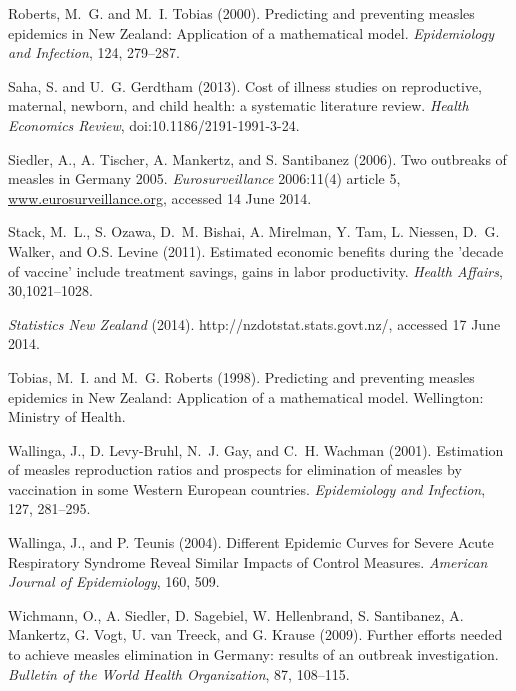 \documentclass{article}
\begin{document}
\begin{thebibliography}{}
Roberts, M.~G. and M.~I. Tobias (2000).
\newblock Predicting and preventing measles epidemics in New Zealand: Application of a mathematical model. 
\newblock \emph{Epidemiology and Infection}, 124, 279--287.

Saha, S. and U.~G. Gerdtham (2013).
\newblock Cost of illness studies on reproductive, maternal, newborn, and child health: a systematic literature review.
\newblock \emph{Health Economics Review}, doi:10.1186/2191-1991-3-24.

Siedler, A., A. Tischer, A. Mankertz, and S. Santibanez (2006).
\newblock Two outbreaks of measles in Germany 2005.
\newblock \emph{Eurosurveillance} 2006:11(4) article 5, \href{http://www.eurosurveillance.org/ViewArticle.aspx?ArticleId=615}{www.eurosurveillance.org}, accessed 14 June 2014.

Stack, M.~L., S. Ozawa, D.~M. Bishai, A. Mirelman, Y. Tam, L. Niessen, D.~G. Walker, and O.S. Levine (2011).
\newblock Estimated economic benefits during the 'decade of vaccine' include treatment savings, gains in labor productivity.
\newblock \emph{Health Affairs}, 30,1021--1028.

\newblock \emph{Statistics New Zealand} (2014).
http://nzdotstat.stats.govt.nz/, accessed 17 June 2014.

Tobias, M.~I. and M.~G. Roberts (1998).
\newblock Predicting and preventing measles epidemics in New Zealand: Application of a mathematical model.
\newblock Wellington: Ministry of Health.

Wallinga, J., D. Levy-Bruhl, N.~J. Gay, and C.~H. Wachman (2001).
\newblock Estimation of measles reproduction ratios and prospects for elimination of measles by vaccination in some Western European countries.
\newblock \emph{Epidemiology and Infection}, 127, 281--295.

Wallinga, J., and P. Teunis (2004).
\newblock Different Epidemic Curves for Severe Acute Respiratory Syndrome Reveal Similar Impacts of Control Measures.
\newblock \emph{American Journal of Epidemiology}, 160, 509.

Wichmann, O., A. Siedler, D. Sagebiel, W. Hellenbrand, S. Santibanez, A. Mankertz, G. Vogt, U. van Treeck, and G. Krause (2009).
\newblock Further efforts needed to achieve measles elimination in Germany: results of an outbreak investigation.
\newblock \emph{Bulletin of the World Health Organization}, 87, 108--115.


\end{thebibliography}
\end{document}
